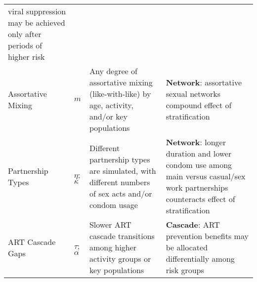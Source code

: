 \begin{tabular}{llp{.35\linewidth}p{.4\linewidth}}
  viral suppression may be achieved only after periods of higher risk
\\
  Assortative Mixing
& $m$
& Any degree of assortative mixing (like-with-like) by age, activity, and/or key populations
& \textbf{Network}: assortative sexual networks compound effect of stratification \cite{Anderson1991}
\\
  Partnership Types
& $\eta$; $\kappa$
& Different partnership types are simulated, with different numbers of sex acts and/or condom usage \cite{Scorgie2012}
& \textbf{Network}: longer duration and lower condom use among main versus casual/sex work partnerships
  counteracts effect of stratification
\\
  ART Cascade Gaps
& $\tau$; $\alpha$
& Slower ART cascade transitions among higher activity groups or key populations \cite{Hakim2018,Green2020}
& \textbf{Cascade}: ART prevention benefits may be allocated differentially among risk groups
\\
\bottomrule
\end{tabular}
